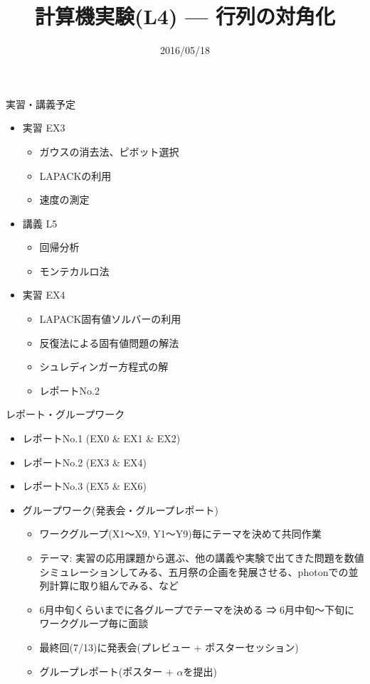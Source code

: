 \documentclass[dvipdfmx]{beamer}
\title{計算機実験(L4) --- 行列の対角化}
\date{2016/05/18}
\begin{document}
\begin{frame}
  \titlepage
  \tableofcontents
\end{frame}






\section{}
\begin{frame}[t,fragile]{実習・講義予定}
  \begin{itemize}
    \setlength{\itemsep}{1em}
  \item 実習 EX3
    \begin{itemize}
    \item ガウスの消去法、ピボット選択
    \item LAPACKの利用
    \item 速度の測定
    \end{itemize}
  \item 講義 L5
    \begin{itemize}
    \item 回帰分析
    \item モンテカルロ法
    \end{itemize}
  \item 実習 EX4
    \begin{itemize}
    \item LAPACK固有値ソルバーの利用
    \item 反復法による固有値問題の解法
    \item シュレディンガー方程式の解
    \item レポートNo.2
    \end{itemize}
  \end{itemize}
\end{frame}

\begin{frame}[t,fragile]{レポート・グループワーク}
  \begin{itemize}
  \item レポートNo.1 (EX0 \& EX1 \& EX2)
  \item レポートNo.2 (EX3 \& EX4)
  \item レポートNo.3 (EX5 \& EX6)
  \item グループワーク(発表会・グループレポート)
    \begin{itemize}
    \item ワークグループ(X1〜X9, Y1〜Y9)毎にテーマを決めて共同作業
    \item テーマ: 実習の応用課題から選ぶ、他の講義や実験で出てきた問題を数値シミュレーションしてみる、五月祭の企画を発展させる、photonでの並列計算に取り組んでみる、など
    \item 6月中旬くらいまでに各グループでテーマを決める ⇒ 6月中旬〜下旬にワークグループ毎に面談
    \item 最終回(7/13)に発表会(プレビュー + ポスターセッション)
    \item グループレポート(ポスター + $\alpha$を提出)
    \end{itemize}
  \end{itemize}
\end{frame}
\end{document}
